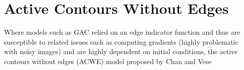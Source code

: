 \chapter{Active Contours Without Edges}
Where models such as GAC relied on an edge indicator function and thus are susceptible to related issues such as computing gradients (highly problematic with noisy images) and are highly dependent on initial conditions, the active contours without edges (ACWE) model proposed by Chan and Vese \cite{chan2001active}